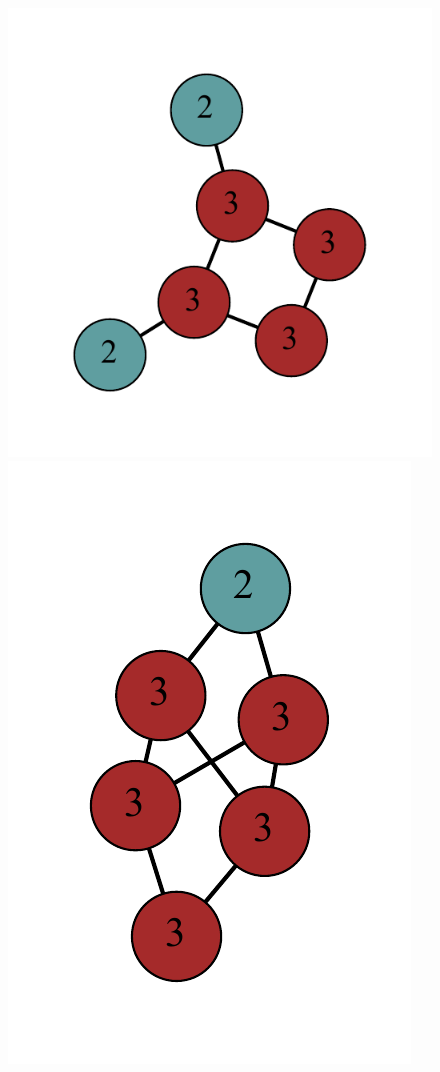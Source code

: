 \documentclass[12pt]{article}
\theoremstyle{plain}
\theoremstyle{definition}
\theoremstyle{remark}
\begin{document}
\begin{figure}[htb]
     	\includegraphics[scale=0.35]{Delta3TriangleFree/001110011001000[3,3,2,2,3,3].pdf}
     	\includegraphics[scale=0.35]{Delta3TriangleFree/001110111011000[3,3,3,2,3,3].pdf}

\end{figure}
\end{document}
